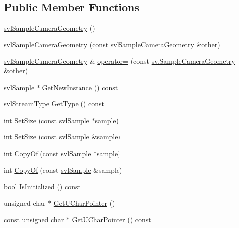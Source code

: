 \subsection*{Public Member Functions}
\begin{DoxyCompactItemize}
\item 
\hyperlink{classsvl_sample_camera_geometry_a22c6f6d8cb45fec2b643c568fbda4ad7}{svl\+Sample\+Camera\+Geometry} ()
\item 
\hyperlink{classsvl_sample_camera_geometry_a8f41f22e66cd08bd2dd82057caf71687}{svl\+Sample\+Camera\+Geometry} (const \hyperlink{classsvl_sample_camera_geometry}{svl\+Sample\+Camera\+Geometry} \&other)
\item 
\hyperlink{classsvl_sample_camera_geometry}{svl\+Sample\+Camera\+Geometry} \& \hyperlink{classsvl_sample_camera_geometry_a096223939bf1d43cd3753b849194674a}{operator=} (const \hyperlink{classsvl_sample_camera_geometry}{svl\+Sample\+Camera\+Geometry} \&other)
\item 
\hyperlink{classsvl_sample}{svl\+Sample} $\ast$ \hyperlink{classsvl_sample_camera_geometry_aa52d90abdf8e95655d57b4ee689a76e7}{Get\+New\+Instance} () const 
\item 
\hyperlink{svl_definitions_8h_aa00696d338a58db361335a01fd11e122}{svl\+Stream\+Type} \hyperlink{classsvl_sample_camera_geometry_aadbf751373210cc5017ab2c0a4a94034}{Get\+Type} () const 
\item 
int \hyperlink{classsvl_sample_camera_geometry_a091bd82f26b356bda32651c304cdd42d}{Set\+Size} (const \hyperlink{classsvl_sample}{svl\+Sample} $\ast$sample)
\item 
int \hyperlink{classsvl_sample_camera_geometry_acb38c234da3995da212df7a193df9de2}{Set\+Size} (const \hyperlink{classsvl_sample}{svl\+Sample} \&sample)
\item 
int \hyperlink{classsvl_sample_camera_geometry_a12731ae1bc5d0c7ece215739db4ac5a0}{Copy\+Of} (const \hyperlink{classsvl_sample}{svl\+Sample} $\ast$sample)
\item 
int \hyperlink{classsvl_sample_camera_geometry_ae1914f13bd00c1eae2ae546a581c0718}{Copy\+Of} (const \hyperlink{classsvl_sample}{svl\+Sample} \&sample)
\item 
bool \hyperlink{classsvl_sample_camera_geometry_afe8f2d20600de3aeea61dd5aa518c3a7}{Is\+Initialized} () const 
\item 
unsigned char $\ast$ \hyperlink{classsvl_sample_camera_geometry_a73a4d4f0d9bd6850dc46a264f6f07d52}{Get\+U\+Char\+Pointer} ()
\item 
const unsigned char $\ast$ \hyperlink{classsvl_sample_camera_geometry_ab6bb23a9c6e3babeed7e0f1fedc65100}{Get\+U\+Char\+Pointer} () const 

\end{DoxyCompactItemize}
